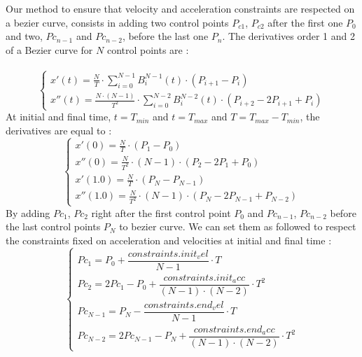 \documentclass{article}
\begin{document}
    Our method to ensure that velocity and acceleration constraints are respected on a bezier curve, consists in adding two control points $P_{c1}$, $P_{c2}$ after the first one $P_0$ and two, $Pc_{n-1}$ and $Pc_{n-2}$, before the last one $P_n$. The derivatives order 1 and 2 of a Bezier curve for $N$ control points are :\\\\
    \begin{equation}
    \begin{cases}
    x'(t) = \frac{N}{T} \cdot \sum_{i=0}^{N-1} B_i^{N-1}(t) \cdot (P_{i+1}-P_i)\\
    x''(t) = \frac{N\cdot (N-1)}{T^2} \cdot \sum_{i=0}^{N-2} B_i^{N-2}(t) \cdot (P_{i+2} - 2 P_{i+1} + P_i)
    \end{cases}
    \end{equation}
    At initial and final time, $t=T_{min}$ and $t=T_{max}$ and $T=T_{max}-T_{min}$, the derivatives are equal to :\\
    \begin{equation}
    \begin{cases}
    x'(0) = \frac{N}{T} \cdot (P_1-P_0)\\
    x''(0) = \frac{N}{T^2} \cdot(N-1) \cdot (P_2 - 2 P_1 + P_0)\\
    x'(1.0) = \frac{N}{T} \cdot (P_N-P_{N-1})\\
    x''(1.0) = \frac{N}{T^2} \cdot (N-1) \cdot (P_N - 2 P_{N-1} + P_{N-2})
    \end{cases}
    \end{equation}
    By adding $Pc_{1}$, $Pc_{2}$ right after the first control point $P_0$ and $Pc_{n-1}$, $Pc_{n-2}$ before the last control points $P_N$ to bezier curve. We can set them as followed to respect the constraints fixed on acceleration and velocities at initial and final time :\\

    \begin{equation}
    \begin{cases}
    Pc_1 = P_0 + \dfrac{constraints.init_vel}{N-1} \cdot T\\
    Pc_2 = 2 Pc_1 - P_0 + \dfrac{constraints.init_acc}{(N-1) \cdot (N-2)}  \cdot T^2\\
    Pc_{N-1} = P_N - \dfrac{constraints.end_vel}{N-1}  \cdot T\\
    Pc_{N-2} = 2 Pc_{N-1} - P_N + \dfrac{constraints.end_acc}{(N-1) \cdot (N-2)}  \cdot T^2
    \end{cases}
    \end{equation}
\end{document}
